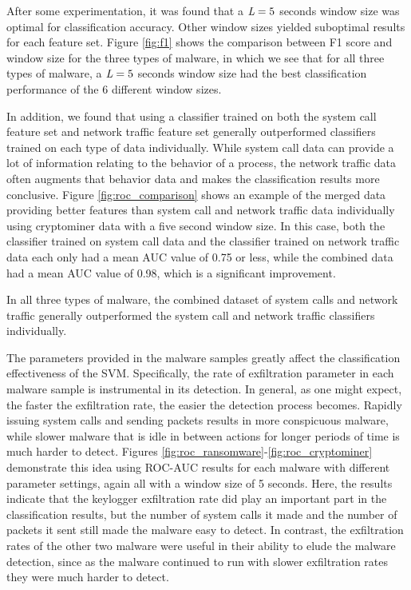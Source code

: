 \documentclass[runningheads]{llncs}
\begin{document}
\indent After some experimentation, it was found that a $\emph{L}=5$ seconds window size was optimal for classification accuracy. Other window sizes yielded suboptimal results for each feature set. Figure \ref{fig:f1} shows the comparison between F1 score and window size for the three types of malware, in which we see that for all three types of malware, a $\emph{L}=5$ seconds window size had the best classification performance of the 6 different window sizes.

\indent In addition, we found that using a classifier trained on both the system call feature set and network traffic feature set generally outperformed classifiers trained on each type of data individually. While system call data can provide a lot of information relating to the behavior of a process, the network traffic data often augments that behavior data and makes the classification results more conclusive. Figure \ref{fig:roc_comparison} shows an example of the merged data providing better features than system call and network traffic data individually using cryptominer data with a five second window size. In this case, both the classifier trained on system call data and the classifier trained on network traffic data each only had a mean AUC value of 0.75 or less, while the combined data had a mean AUC value of 0.98, which is a significant improvement.

In all three types of malware, the combined dataset of system calls and network traffic generally outperformed the system call and network traffic classifiers individually. 

\indent The parameters provided in the malware samples greatly affect the classification effectiveness of the SVM. Specifically, the rate of exfiltration parameter in each malware sample is instrumental in its detection. In general, as one might expect, the faster the exfiltration rate, the easier the detection process becomes. Rapidly issuing system calls and sending packets results in more conspicuous malware, while slower malware that is idle in between actions for longer periods of time is much harder to detect. Figures \ref{fig:roc_ransomware}-\ref{fig:roc_cryptominer} demonstrate this idea using ROC-AUC results for each malware with different parameter settings, again all with a window size of 5 seconds. Here, the results indicate that the keylogger exfiltration rate did play an important part in the classification results, but the number of system calls it made and the number of packets it sent still made the malware easy to detect. In contrast, the exfiltration rates of the other two malware were useful in their ability to elude the malware detection, since as the malware continued to run with slower exfiltration rates they were much harder to detect.
\end{document}
